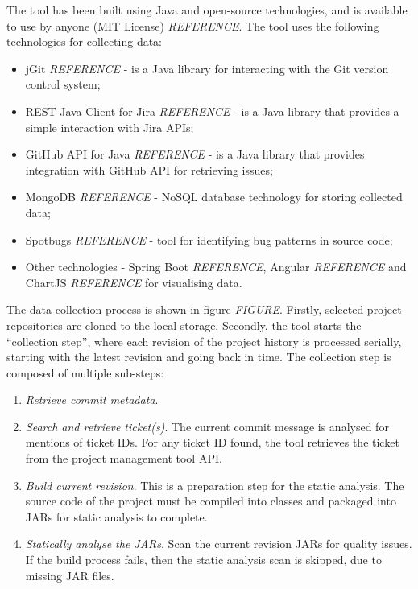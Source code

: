 \documentclass{mpaper}
\begin{document}
The tool has been built using Java and open-source technologies, and is
available to use by anyone (MIT License) \emph{REFERENCE}. The tool uses the
following technologies for collecting data:

\begin{itemize}
  \item jGit \emph{REFERENCE} - is a Java library for interacting with the Git
  version control system;
  \item REST Java Client for Jira \emph{REFERENCE} - is a Java library that
  provides a simple interaction with Jira APIs;
  \item GitHub API for Java \emph{REFERENCE} - is a Java library that provides
  integration with GitHub API for retrieving issues;
  \item MongoDB \emph{REFERENCE} - NoSQL database technology for storing
  collected data;
  \item Spotbugs \emph{REFERENCE} - tool for identifying bug patterns in source
  code;
  \item Other technologies - Spring Boot \emph{REFERENCE}, Angular \emph{REFERENCE} and ChartJS \emph{REFERENCE}
  for visualising data.
\end{itemize}

The data collection process is shown in figure \emph{FIGURE}. Firstly, selected
project repositories are cloned to the local storage. Secondly, the tool starts
the ``collection step'', where each revision of the project history is processed
serially, starting with the latest revision and going back in time. The
collection step is composed of multiple sub-steps:
\begin{enumerate}
  \item \emph{Retrieve commit metadata}.
  \item \emph{Search and retrieve ticket(s)}. The current commit message is
  analysed for mentions of ticket IDs. For any ticket ID found, the tool
  retrieves the ticket from the project management tool API.
  \item \emph{Build current revision}. This is a preparation step for the static
  analysis. The source code of the project must be compiled into classes and
  packaged into JARs for static analysis to complete.
  \item \emph{Statically analyse the JARs}. Scan the current revision JARs for
  quality issues. If the build process fails, then the static analysis scan is
  skipped, due to missing JAR files. 
\end{enumerate}
\end{document}
